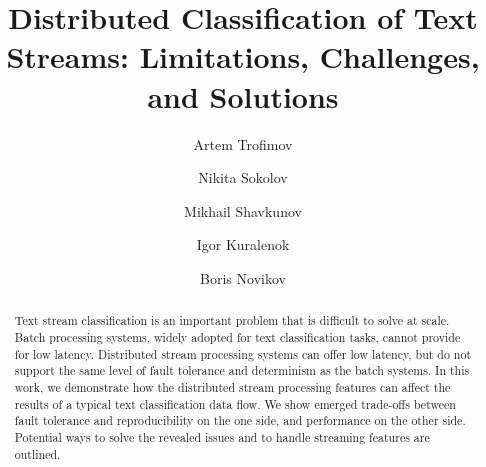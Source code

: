 \documentclass[sigconf]{acmart}
\theoremstyle{remark}
\begin{document}

\title {Distributed Classification of Text Streams: Limitations, Challenges, and Solutions}


\author{Artem Trofimov}

\author{Nikita Sokolov}

\author{Mikhail Shavkunov}

\author{Igor Kuralenok}

\author{Boris Novikov}

\begin{abstract}

Text stream classification is an important problem that is difficult to solve at scale. 
Batch processing systems, widely adopted for text classification tasks,   cannot provide for low latency. 
Distributed stream processing systems can offer low latency, but do not support the same level of fault tolerance and determinism as the batch systems. 
In this work, we demonstrate how the distributed stream processing features can affect the results of a typical text classification data flow. 
We show emerged trade-offs between fault tolerance and reproducibility on the one side, and performance on the other side. 
Potential ways to solve the revealed issues and to handle streaming features are outlined.

\end{abstract}
\end{document}
